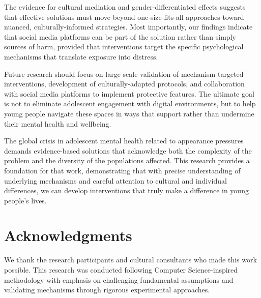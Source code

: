 \documentclass{article}
\begin{document}
The evidence for cultural mediation and gender-differentiated effects suggests that effective solutions must move beyond one-size-fits-all approaches toward nuanced, culturally-informed strategies. Most importantly, our findings indicate that social media platforms can be part of the solution rather than simply sources of harm, provided that interventions target the specific psychological mechanisms that translate exposure into distress.

Future research should focus on large-scale validation of mechanism-targeted interventions, development of culturally-adapted protocols, and collaboration with social media platforms to implement protective features. The ultimate goal is not to eliminate adolescent engagement with digital environments, but to help young people navigate these spaces in ways that support rather than undermine their mental health and wellbeing.

The global crisis in adolescent mental health related to appearance pressures demands evidence-based solutions that acknowledge both the complexity of the problem and the diversity of the populations affected. This research provides a foundation for that work, demonstrating that with precise understanding of underlying mechanisms and careful attention to cultural and individual differences, we can develop interventions that truly make a difference in young people's lives.

\section*{Acknowledgments}

We thank the research participants and cultural consultants who made this work possible. This research was conducted following Computer Science-inspired methodology with emphasis on challenging fundamental assumptions and validating mechanisms through rigorous experimental approaches.
\end{document}
